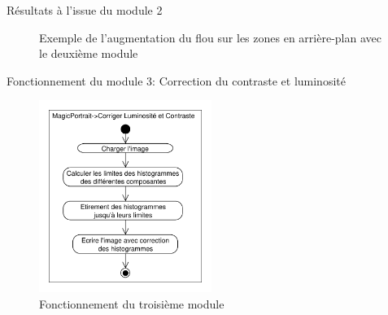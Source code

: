 \documentclass{beamer}
\begin{document}
\begin{frame}{Résultats à l'issue du module 2}
\begin{figure}[htp]
 \caption{Exemple de l'augmentation du flou sur les zones en arrière-plan avec le deuxième module}
 \label{fig:ProfExemple}
\end{figure}
\end{frame}

\begin{frame}{Fonctionnement du module 3: Correction du contraste et luminosité}
\begin{figure}
\centering
\includegraphics[width=0.5\textwidth]{DiagrammeActivites_30_Contraste}
\caption{Fonctionnement du troisième module}
\end{figure}
\end{frame}
\end{document}
